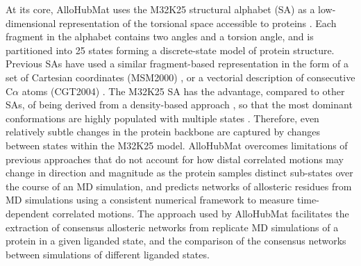 At its core, AlloHubMat uses the M32K25 structural alphabet (SA) as a low-dimensional representation of the torsional space accessible to proteins \cite{Pandini:2010aa}. Each fragment in the alphabet contains two angles and a torsion angle, and is partitioned into 25 states forming a discrete-state model of protein structure. Previous SAs have used a similar fragment-based representation in the form of a set of Cartesian coordinates (MSM2000) \cite{Micheletti:2000aa}, or a vectorial description of consecutive C$\alpha$ atoms (CGT2004) \cite{Camproux:2004aa}. The M32K25 SA has the advantage, compared to other SAs, of being derived from a density-based approach \cite{ankerst1999optics}, so that the most dominant conformations are highly populated with multiple states \cite{Pandini:2010aa}. Therefore, even relatively subtle changes in the protein backbone are captured by changes between states within the M32K25 model. AlloHubMat overcomes limitations of previous approaches \cite{Pandini:2012aa,Lange:2006aa} that do not account for how distal correlated motions may change in direction and magnitude as the protein samples distinct sub-states over the course of an MD simulation, and predicts networks of allosteric residues from MD simulations using a consistent numerical framework to measure time-dependent correlated motions. The approach used by AlloHubMat facilitates the extraction of consensus allosteric networks from replicate MD simulations of a protein in a given liganded state, and the comparison of the consensus networks between simulations of different liganded states.
%
%
\\\\
%
%
